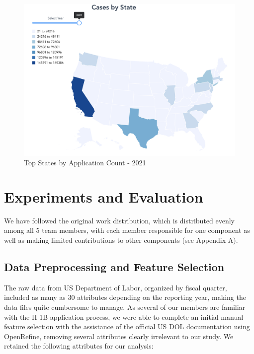 \documentclass[sigconf]{acmart}
\begin{document}
\begin{figure}
  \includegraphics[width=\linewidth]{report_images/worksite2021.png}
  \caption{Top States by Application Count - 2021}
  \label{fig:topstates2021}
\end{figure}



\section{Experiments and Evaluation}

We have followed the original work distribution, which is distributed evenly among all 5 team members, 
with each member responsible for one component as well as making limited contributions to other components (see Appendix A). 


\subsection{Data Preprocessing and Feature Selection}

The raw data from US Department of Labor, organized by fiscal quarter, 
included as many as 30 attributes depending on the reporting year, 
making the data files quite cumbersome to manage. 
As several of our members are familiar with the H-1B application process, 
we were able to complete an initial manual feature selection with the assistance 
of the official US DOL documentation using OpenRefine, 
removing several attributes clearly irrelevant to our study. 
We retained the following attributes for our analysis:
\end{document}
